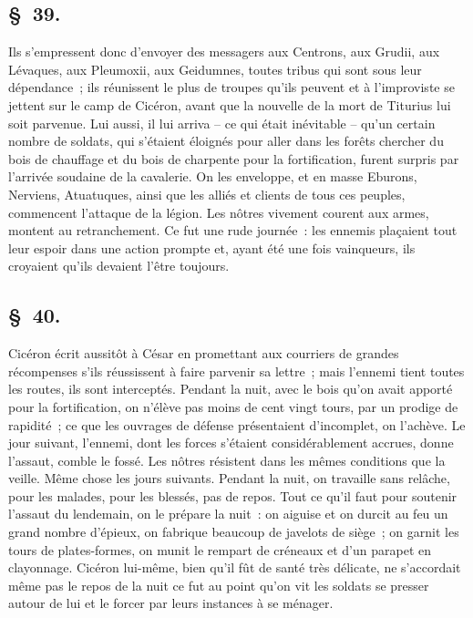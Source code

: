 \documentclass[french,twoside]{book} %
\begin{document}
\subsection[{§ 39.}]{ \textsc{§ 39.} }
\noindent Ils s’empressent donc d’envoyer des messagers aux Centrons, aux Grudii, aux Lévaques, aux Pleumoxii, aux Geidumnes, toutes tribus qui sont sous leur dépendance ; ils réunissent le plus de troupes qu’ils peuvent et à l’improviste se jettent sur le camp de Cicéron, avant que la nouvelle de la mort de Titurius lui soit parvenue. Lui aussi, il lui arriva – ce qui était inévitable – qu’un certain nombre de soldats, qui s’étaient éloignés pour aller dans les forêts chercher du bois de chauffage et du bois de charpente pour la fortification, furent surpris par l’arrivée soudaine de la cavalerie. On les enveloppe, et en masse Eburons, Nerviens, Atuatuques, ainsi que les alliés et clients de tous ces peuples, commencent l’attaque de la légion. Les nôtres vivement courent aux armes, montent au retranchement. Ce fut une rude journée : les ennemis plaçaient tout leur espoir dans une action prompte et, ayant été une fois vainqueurs, ils croyaient qu’ils devaient l’être toujours.
\subsection[{§ 40.}]{ \textsc{§ 40.} }
\noindent Cicéron écrit aussitôt à César en promettant aux courriers de grandes récompenses s’ils réussissent à faire parvenir sa lettre ; mais l’ennemi tient toutes les routes, ils sont interceptés. Pendant la nuit, avec le bois qu’on avait apporté pour la fortification, on n’élève pas moins de cent vingt tours, par un prodige de rapidité ; ce que les ouvrages de défense présentaient d’incomplet, on l’achève. Le jour suivant, l’ennemi, dont les forces s’étaient considérablement accrues, donne l’assaut, comble le fossé. Les nôtres résistent dans les mêmes conditions que la veille. Même chose les jours suivants. Pendant la nuit, on travaille sans relâche, pour les malades, pour les blessés, pas de repos. Tout ce qu’il faut pour soutenir l’assaut du lendemain, on le prépare la nuit : on aiguise et on durcit au feu un grand nombre d’épieux, on fabrique beaucoup de javelots de siège ; on garnit les tours de plates-formes, on munit le rempart de créneaux et d’un parapet en clayonnage. Cicéron lui-même, bien qu’il fût de santé très délicate, ne s’accordait même pas le repos de la nuit ce fut au point qu’on vit les soldats se presser autour de lui et le forcer par leurs instances à se ménager.
\end{document}
